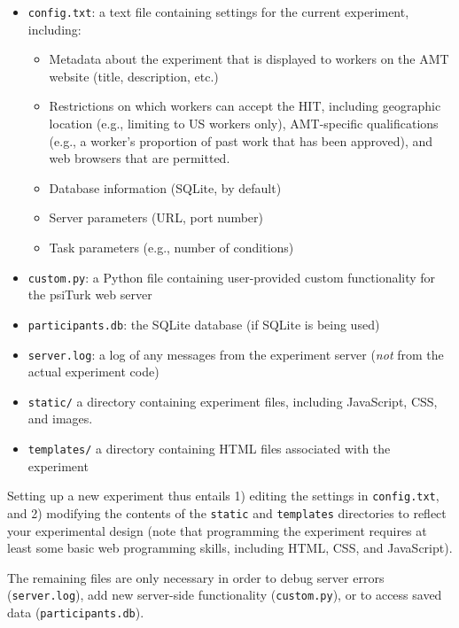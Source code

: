 \documentclass[twocolumn]{svjour3}          %
\newcommand{\psiturk}[0]{\textsf{psiTurk}}
\begin{document}
\begin{itemize}
\item \texttt{config.txt}: a text file containing settings for the current experiment, including:

\begin{itemize}
\item Metadata about the experiment that is displayed to workers on the AMT website (title, description, etc.)
\item Restrictions on which workers can accept the HIT, including geographic location (e.g., limiting to US workers only), AMT-specific qualifications (e.g., a worker's proportion of past work that has been approved), and web browsers that are permitted.
\item Database information (SQLite, by default)
\item Server parameters (URL, port number)
\item Task parameters (e.g., number of conditions)
\end{itemize}


\item \texttt{custom.py}: a Python file containing user-provided custom functionality for the \psiturk{} web server

\item \texttt{participants.db}: the SQLite database (if SQLite is being used)

\item \texttt{server.log}: a log of any messages from the experiment server (\emph{not} from the actual experiment code)

\item \texttt{static/} a directory containing experiment files, including JavaScript, CSS, and images.

\item \texttt{templates/} a directory containing HTML files associated with the experiment 
\end{itemize}

Setting up a new experiment thus entails 1) editing the settings in \texttt{config.txt}, and 2) modifying the contents of the \texttt{static} and \texttt{templates} directories to reflect your experimental design (note that programming the experiment requires at least some basic web programming skills, including HTML, CSS, and JavaScript).

The remaining files are only necessary in order to debug server errors (\texttt{server.log}), add new server-side functionality (\texttt{custom.py}), or to access saved data (\texttt{participants.db}).
\end{document}
